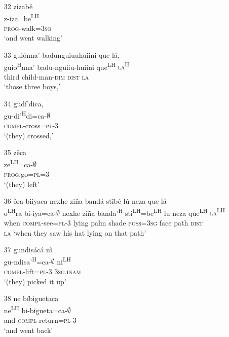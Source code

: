 \begin{itemize}
\item[32]
\glll zizab\v{e} \\
z-iza=be\textsuperscript{LH} \\
\textsc{prog}-walk=\textsc{3sg} \\
\glt `and went walking'


\item[33]
\glll gui\'{o}nna' badunguiuuhuiini que l\'{a}, \\
guio\textsuperscript{H}nna' badu-nguiiu-huiini que\textsuperscript{LH} \textsc{la\textsuperscript{H}}\\
third child-man-\textsc{dim} \textsc{dist} \textsc{la} \\
\glt `those three boys,'


\item[34]
\glll gud\'{i}'dica, \\
gu-di'\textsuperscript{H}di=ca-$\emptyset$  \\
\textsc{compl}-cross=\textsc{pl}-\textsc{3} \\
\glt `(they) crossed,'


\item[35]
\glll z\v{e}ca \\
ze\textsuperscript{LH}=ca-$\emptyset$ \\
\textsc{prog}.go=\textsc{pl}=\textsc{3} \\
\glt `(they) left'
 

\item[36]
\glll \v{o}ra biiyaca nexhe zi\~{n}a band\'{a} st\v{i}b\'{e} l\'{u} neza que l\'{a} \\
o\textsuperscript{LH}ra bi-iya=ca-$\emptyset$ nexhe zi\~{n}a banda'\textsuperscript{H} sti\textsuperscript{LH}=be\textsuperscript{LH} lu neza que\textsuperscript{LH} \textsc{la\textsuperscript{LH}} \\
when \textsc{compl}-see=\textsc{pl}-\textsc{3} lying palm shade \textsc{poss}=\textsc{3sg} face path \textsc{dist}  \\\textsc{la}
\glt `when they saw his hat lying on that path'


\item[37]
\glll gundis\'{a}c\'{a} n\v{i}  \\
gu-ndisa'\textsuperscript{H}=ca-$\emptyset$ ni\textsuperscript{LH}  \\
\textsc{compl}-lift=\textsc{pl}-\textsc{3} \textsc{3sg.inam}  \\
\glt `(they) picked it up'


\item[38]
\glll ne b\'{i}biguetaca \\
ne\textsuperscript{LH} bi-bigueta=ca-$\emptyset$ \\
and \textsc{compl}-return=\textsc{pl}-\textsc{3} \\
\glt `and went back'



\end{itemize}
